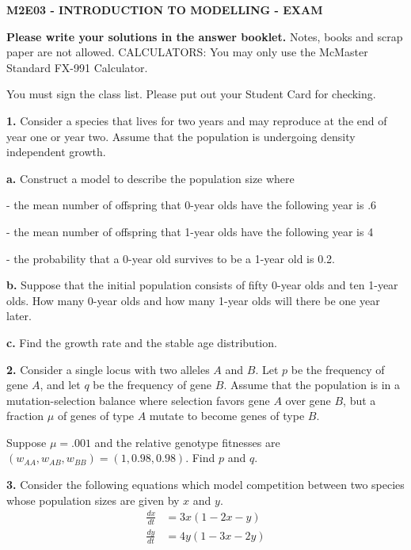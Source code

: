 \documentclass[reqno,12pt]{amsart}
\def \dxdt{\frac{dx}{dt}}
\def \dydt{\frac{dy}{dt}}
\begin{document}
\begin{center}
{\bf M2E03 - INTRODUCTION TO MODELLING - EXAM}
\end{center}

\vspace{.5cm}
\noindent
{\bf Please write your solutions in the answer booklet.}
Notes, books and scrap paper are not allowed.
CALCULATORS:  You may only use the McMaster Standard FX-991 Calculator.

\vspace{.5cm}
\noindent
You must sign the class list.
Please put out your Student Card for checking.




\vspace{1cm}


\noindent
{\bf 1.}  Consider a species that lives for two years and may reproduce
at the end of year one or year two.  Assume that the population is
undergoing density independent growth.

\noindent
{\bf a.} Construct a model to describe the population size where

- the mean number of offspring that 0-year olds have the following
year is .6 

- the mean number of offspring that 1-year olds have the following
year is 4

- the probability that a 0-year old survives to be a 1-year old
is 0.2.

\noindent
{\bf b.}  Suppose that the initial population consists of fifty 0-year
olds and ten 1-year olds.  How many 0-year olds and how many
1-year olds will there be one year later.

\noindent
{\bf c.}  Find the growth rate and the stable age distribution.

\vspace{1cm}

\noindent
{\bf 2.}  Consider a single locus with two alleles $A$ and $B$.  Let
$p$ be the frequency of gene $A$, and let $q$ be the frequency of
gene $B$.  Assume that the population is in a mutation-selection
balance where selection favors gene $A$ over gene $B$, but a
fraction $\mu$ of genes of type $A$ mutate to become genes of
type $B$.

Suppose $\mu = .001$ and the relative genotype fitnesses are
$(w_{AA} , w_{AB}, w_{BB}) = (1,0.98,0.98)$.  Find $p$ and $q$.


\vspace{1cm}

\noindent
{\bf 3.}  Consider the following equations which model competition between
two species whose population sizes are given by $x$ and $y$.
$$
\begin{aligned}
\dxdt &= 3x (1 - 2x - y)	\\
\dydt &= 4y (1 - 3x - 2y)
\end{aligned}
$$
\end{document}
